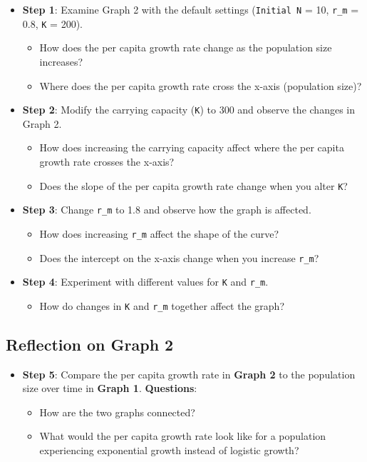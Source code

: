\documentclass[
  a4paper]{book}
\providecommand{\tightlist}{%
  \setlength{\itemsep}{0pt}\setlength{\parskip}{0pt}}
\begin{document}
\begin{itemize}
\tightlist
\item
  \textbf{Step 1}: Examine Graph 2 with the default settings (\texttt{Initial\ N} = 10, \texttt{r\_m} = 0.8, \texttt{K} = 200).

  \begin{itemize}
  \item
    How does the per capita growth rate change as the population size increases?
  \item
    Where does the per capita growth rate cross the x-axis (population size)?
  \end{itemize}
\item
  \textbf{Step 2}: Modify the carrying capacity (\texttt{K}) to 300 and observe the changes in Graph 2.

  \begin{itemize}
  \item
    How does increasing the carrying capacity affect where the per capita growth rate crosses the x-axis?
  \item
    Does the slope of the per capita growth rate change when you alter \texttt{K}?
  \end{itemize}
\item
  \textbf{Step 3}: Change \texttt{r\_m} to 1.8 and observe how the graph is affected.

  \begin{itemize}
  \item
    How does increasing \texttt{r\_m} affect the shape of the curve?
  \item
    Does the intercept on the x-axis change when you increase \texttt{r\_m}?
  \end{itemize}
\item
  \textbf{Step 4}: Experiment with different values for \texttt{K} and \texttt{r\_m}.

  \begin{itemize}
  \item
    How do changes in \texttt{K} and \texttt{r\_m} together affect the graph?
  \end{itemize}
\end{itemize}

\subsection{Reflection on Graph 2}\label{reflection-on-graph-2}

\begin{itemize}
\tightlist
\item
  \textbf{Step 5}: Compare the per capita growth rate in \textbf{Graph 2} to the population size over time in \textbf{Graph 1}.
  \textbf{Questions}:

  \begin{itemize}
  \item
    How are the two graphs connected?
  \item
    What would the per capita growth rate look like for a population experiencing exponential growth instead of logistic growth?
  \end{itemize}
\end{itemize}
\end{document}
